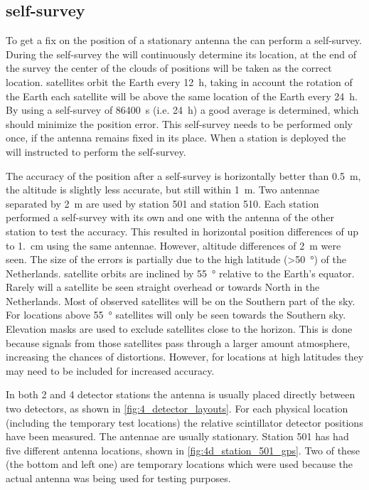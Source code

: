 \subsection{\gps self-survey}

To get a fix on the position of a stationary \gps antenna the \gps can perform a self-survey. During the self-survey the \gps will continuously determine its location, at the end of the survey the center of the clouds of positions will be taken as the correct location. \gps satellites orbit the Earth every \SI{12}{\hour}, taking in account the rotation of the Earth each \gps satellite will be above the same location of the Earth every \SI{24}{\hour}. By using a self-survey of \SI{86400}{\second} (i.e. \SI{24}{\hour}) a good average is determined, which should minimize the position error. This self-survey needs to be performed only once, if the \gps antenna remains fixed in its place. When a \hisparc station is deployed the \gps will instructed to perform the self-survey.

The accuracy of the position after a self-survey is horizontally better than \SI{0.5}{\meter}, the altitude is slightly less accurate, but still within \SI{1}{\meter}. Two \gps antennae separated by \SI{2}{\meter} are used by station 501 and station 510. Each station performed a self-survey with its own \gps and one with the \gps antenna of the other station to test the accuracy. This resulted in horizontal position differences of up to \SI{1.}{\centi\meter} using the same \gps antennae. However, altitude differences of \SI{2}{\meter} were seen. The size of the errors is partially due to the high latitude (\SI{>50}{\degree}) of the Netherlands. \gps satellite orbits are inclined by \SI{55}{\degree} relative to the Earth's equator. Rarely will a satellite be seen straight overhead or towards North in the Netherlands. Most of observed satellites will be on the Southern part of the sky. For locations above \SI{55}{\degree} satellites will only be seen towards the Southern sky. Elevation masks are used to exclude \gps satellites close to the horizon. This is done because signals from those satellites pass through a larger amount atmosphere, increasing the chances of distortions. However, for locations at high latitudes they may need to be included for increased accuracy.

In both 2 and 4 detector stations the \gps antenna is usually placed directly between two detectors, as shown in \cref{fig:4_detector_layouts}. For each physical \gps location (including the temporary test locations) the relative scintillator detector positions have been measured. The \gps antennae are usually stationary. Station 501 has had five different \gps antenna locations, shown in \cref{fig:4d_station_501_gps}. Two of these (the bottom and left one) are temporary locations which were used because the actual \gps antenna was being used for testing purposes.

